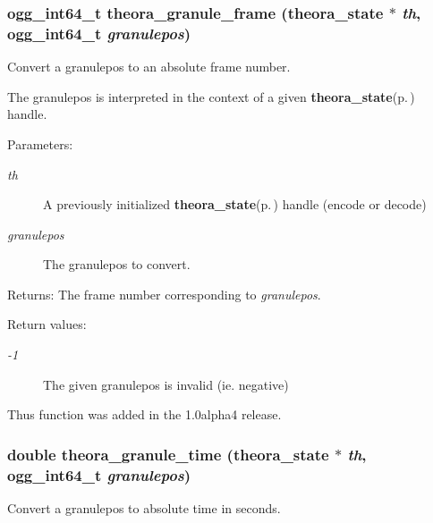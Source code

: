 \subsubsection{\setlength{\rightskip}{0pt plus 5cm}ogg\_\-int64\_\-t theora\_\-granule\_\-frame ({\bf theora\_\-state} $\ast$ {\em th}, ogg\_\-int64\_\-t {\em granulepos})}\label{theora_8h_a27}


Convert a granulepos to an absolute frame number. 

The granulepos is interpreted in the context of a given {\bf theora\_\-state}{\rm (p.\,\pageref{structtheora__state})} handle.

\begin{Desc}
\item[Parameters:]
\begin{description}
\item[{\em th}]A previously initialized {\bf theora\_\-state}{\rm (p.\,\pageref{structtheora__state})} handle (encode or decode) \item[{\em granulepos}]The granulepos to convert. \end{description}
\end{Desc}
\begin{Desc}
\item[Returns:]The frame number corresponding to {\em granulepos\/}. \end{Desc}
\begin{Desc}
\item[Return values:]
\begin{description}
\item[{\em -1}]The given granulepos is invalid (ie. negative)\end{description}
\end{Desc}
Thus function was added in the 1.0alpha4 release. 
\subsubsection{\setlength{\rightskip}{0pt plus 5cm}double theora\_\-granule\_\-time ({\bf theora\_\-state} $\ast$ {\em th}, ogg\_\-int64\_\-t {\em granulepos})}\label{theora_8h_a28}


Convert a granulepos to absolute time in seconds. 

